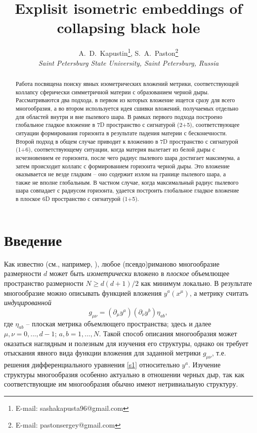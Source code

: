 \documentclass[12pt]{article}
\newcommand{\bq}{\begin{equation}}
\newcommand{\eq}{\end{equation}}
\begin{document}
\title{Explisit isometric embeddings of collapsing black hole}
\author{
A.~D.~Kapustin\thanks{E-mail: sashakapusta96@gmail.com},
S.~A.~Paston\thanks{E-mail: pastonsergey@gmail.com}\\
{\it Saint Petersburg State University, Saint Petersburg, Russia}
}
\date{\vskip 15mm}
\maketitle

\begin{abstract}
Работа посвящена поиску явных изометрических вложений
метрики, соответствующей коллапсу сферически симметричной материи с образованием черной дыры.
Рассматриваются два подхода, в первом из которых вложение ищется сразу для всего многообразия, а во втором
используется идея сшивки вложений, получаемых отдельно для областей внутри и вне пылевого шара.
В рамках первого подхода построено глобальное гладкое вложение в 7D пространство с сигнатурой (2+5),
соответствующее ситуации формирования горизонта в результате падения материи с бесконечности.
Второй подход в общем случае приводит к вложению в 7D пространство с сигнатурой (1+6),
соответствующему ситуации, когда материя вылетает из белой дыры с исчезновением ее горизонта,
после чего радиус пылевого шара достигает максимума, а затем происходит коллапс с формированием горизонта черной дыры.
Это вложение оказывается не везде гладким -- оно содержит излом на границе пылевого шара,
а также не вполне глобальным.
В частном случае, когда максимальный радиус пылевого шара совпадает с радиусом горизонта,
удается построить глобальное гладкое вложение в плоское 6D пространство с сигнатурой (1+5).
\end{abstract}

\clearpage

\section{Введение}
Как известно (см., например, \cite{goenner}), любое (псевдо)риманово многообразие размерности $d$ может быть \emph{изометрически} вложено в \emph{плоское} объемлющее пространство размерности $N \geqslant d(d+1)/2$ как минимум локально.
В результате многообразие можно описывать функцией вложения $y^a(x^\mu)$, а метрику считать \emph{индуцированной}
\bq\label{s1}
	g_{\mu \nu} = (\partial_{\mu} y^a) (\partial_{\nu} y^b) \eta_{ab},
\eq
где $\eta_{ab}$ -- плоская метрика объемлющего пространства; здесь и далее $\mu,\nu=0,...,d-1$; $a,b=1,...,N$.
Такой способ описания многообразия может оказаться наглядным и полезным для изучения его структуры, однако он требует отыскания явного вида функции вложения для заданной метрики $g_{\mu\nu}$, т.е. решения дифференциального уравнения \eqref{s1} относительно $y^a$. Изучение структуры многообразия особенно актуально в отношении черных дыр, так как соответствующие им многообразия обычно имеют нетривиальную структуру.
\end{document}

